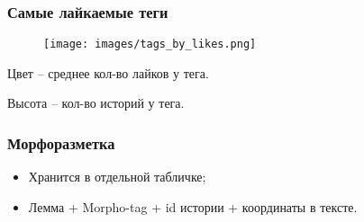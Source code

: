 \documentclass[14pt]{beamer}
\begin{document}
\begin{frame}[fragile]
	
	\frametitle{Самые лайкаемые теги}
	
	\begin{figure}
		\texttt{[image: images/tags\_by\_likes.png]}
	\end{figure}

	Цвет -- среднее кол-во лайков у тега.
	
	Высота -- кол-во историй у тега.
	
\end{frame}

\begin{frame}[fragile]
	
	\frametitle{Морфоразметка}
	
	\begin{itemize}
		\item Хранится в отдельной табличке;
		\item Лемма + Morpho-tag + id истории + координаты в тексте.
	\end{itemize}
	
\end{frame}

\begin{frame}
\end{frame}
\end{document}
